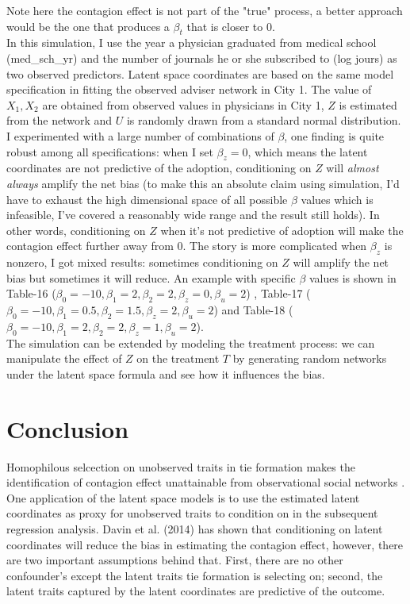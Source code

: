 \documentclass[11pt]{article}
\begin{document}
Note here the contagion effect is not part of the "true" process, a better approach would be the one that produces a $\beta_t$ that is closer to 0.\\

In this simulation, I use the year a physician graduated from medical school (med\_sch\_yr) and the number of journals he or she subscribed to (log jours) as two observed predictors. Latent space coordinates are based on the same model specification in fitting the observed adviser network in City 1. The value of $X_1,X_2$ are obtained from observed values in physicians in City 1, $Z$ is estimated from the network and $U$ is randomly drawn from a standard normal distribution.\\

I experimented with a large number of combinations of $\beta$, one finding is quite robust among all specifications: when I set $\beta_z=0$, which means the latent coordinates are not predictive of the adoption, conditioning on $Z$ will \emph{almost always} amplify the net bias (to make this an absolute claim using simulation, I'd have to exhaust the high dimensional space of all possible $\beta$ values which is infeasible, I've covered a reasonably wide range and the result still holds). In other words, conditioning on $Z$ when it's not predictive of adoption will make the contagion effect further away from 0. The story is more complicated when $\beta_z$ is nonzero, I got mixed results: sometimes conditioning on $Z$ will amplify the net bias but sometimes it will reduce. An example with specific $\beta$ values is shown in Table-16 ($\beta_0=-10, \beta_1=2, \beta_2=2, \beta_z=0, \beta_u = 2$) , Table-17 ($\beta_0=-10, \beta_1=0.5, \beta_2=1.5, \beta_z=2, \beta_u = 2$) and Table-18 ($\beta_0=-10, \beta_1=2, \beta_2=2, \beta_z=1, \beta_u = 2$).\\

The simulation can be extended by modeling the treatment process: we can manipulate the effect of $Z$ on the treatment $T$ by generating random networks under the latent space formula and see how it influences the bias.\\


\section{Conclusion}
Homophilous selcection on unobserved traits in tie formation makes the identification of contagion effect unattainable from observational social networks . One application of the latent space models is to use the estimated latent coordinates as proxy for unobserved traits to condition on in the subsequent regression analysis. Davin et al. (2014) has shown that conditioning on latent coordinates will reduce the bias in estimating the contagion effect, however, there are two important assumptions behind that. First, there are no other confounder's except the latent traits tie formation is selecting on; second, the latent traits captured by the latent coordinates are predictive of the outcome.\\
\end{document}
